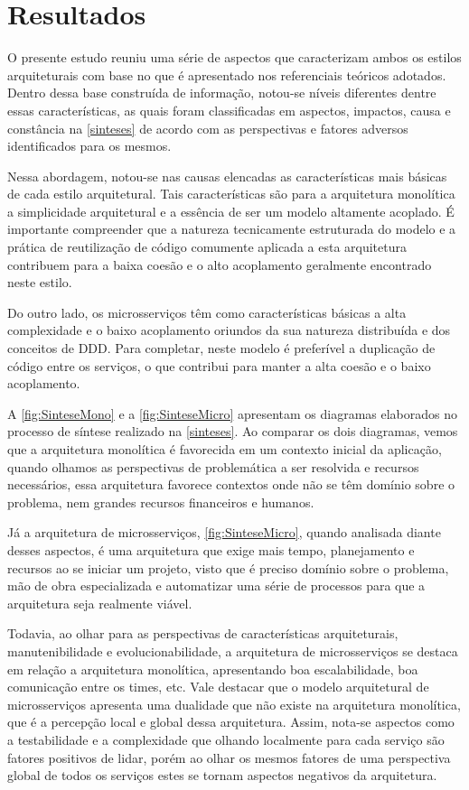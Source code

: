 \chapter{Resultados}

O presente estudo reuniu uma série de aspectos que caracterizam ambos os estilos arquiteturais com
base no que é apresentado nos referenciais teóricos adotados. Dentro dessa base construída de
informação, notou-se níveis diferentes dentre essas características, as quais foram classificadas em
aspectos, impactos, causa e constância na \autoref{sinteses} de acordo com as perspectivas e fatores
adversos identificados para os mesmos.

Nessa abordagem, notou-se nas causas elencadas as características mais básicas de cada estilo
arquitetural. Tais características são para a arquitetura monolítica a simplicidade arquitetural e a
essência de ser um modelo altamente acoplado. É importante compreender que a natureza tecnicamente
estruturada do modelo e a prática de reutilização de código comumente aplicada a esta arquitetura
contribuem para a baixa coesão e o alto acoplamento geralmente encontrado neste estilo.

Do outro lado, os microsserviços têm como características básicas a alta complexidade e o baixo
acoplamento oriundos da sua natureza distribuída e dos conceitos de \gls{DDD}. Para completar, neste
modelo é preferível a duplicação de código entre os serviços, o que contribui para manter a alta
coesão e o baixo acoplamento.

A \autoref{fig:SinteseMono} e a \autoref{fig:SinteseMicro} apresentam os diagramas elaborados no
processo de síntese realizado na \autoref{sinteses}. Ao comparar os dois diagramas, vemos que a arquitetura
monolítica é favorecida em um contexto inicial da aplicação, quando olhamos as perspectivas de
problemática a ser resolvida e recursos necessários, essa arquitetura favorece contextos onde não se
têm domínio sobre o problema, nem grandes recursos financeiros e humanos.

Já a arquitetura de microsserviços, \autoref{fig:SinteseMicro}, quando analisada diante
desses aspectos, é uma arquitetura que exige mais tempo, planejamento e recursos ao se iniciar um
projeto, visto que é preciso domínio sobre o problema, mão de obra especializada e
automatizar uma série de processos para que a arquitetura seja realmente viável.

Todavia, ao olhar para as perspectivas de características arquiteturais, manutenibilidade e
evolucionabilidade, a arquitetura de microsserviços se destaca em relação a arquitetura monolítica,
apresentando boa escalabilidade, boa comunicação entre os times, etc. Vale destacar que o modelo
arquitetural de microsserviços apresenta uma dualidade que não existe na arquitetura monolítica,
que é a percepção local e global dessa arquitetura. Assim, nota-se aspectos como a testabilidade e a
complexidade que olhando localmente para cada serviço são fatores positivos de lidar, porém ao
olhar os mesmos fatores de uma perspectiva global de todos os serviços estes se tornam aspectos
negativos da arquitetura.

